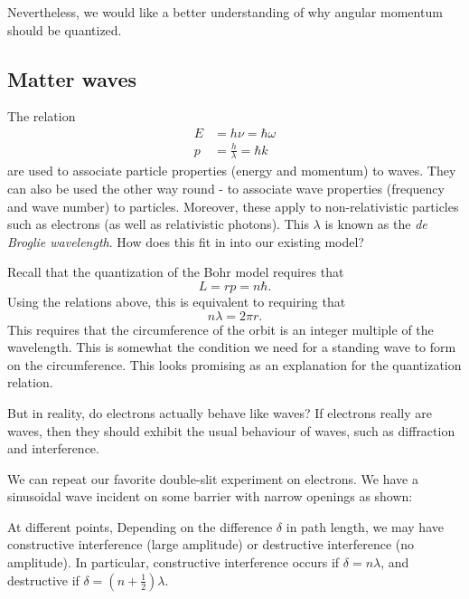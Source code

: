 \documentclass[a4paper]{article}
\begin{document}
Nevertheless, we would like a better understanding of why angular momentum should be quantized.

\subsection{Matter waves}
The relation
\begin{align*}
  E &= h\nu = \hbar \omega\\
  p &= \frac{h}{\lambda} = \hbar k
\end{align*}
are used to associate particle properties (energy and momentum) to waves. They can also be used the other way round - to associate wave properties (frequency and wave number) to particles. Moreover, these apply to non-relativistic particles such as electrons (as well as relativistic photons). This $\lambda$ is known as the \emph{de Broglie wavelength}. How does this fit in into our existing model?

Recall that the quantization of the Bohr model requires that
\[
  L = rp = n\hbar.
\]
Using the relations above, this is equivalent to requiring that
\[
  n\lambda = 2\pi r.
\]
This requires that the circumference of the orbit is an integer multiple of the wavelength. This is somewhat the condition we need for a standing wave to form on the circumference. This looks promising as an explanation for the quantization relation.

But in reality, do electrons actually behave like waves? If electrons really are waves, then they should exhibit the usual behaviour of waves, such as diffraction and interference.

We can repeat our favorite double-slit experiment on electrons. We have a sinusoidal wave incident on some barrier with narrow openings as shown:
\begin{center}
\end{center}
At different points, Depending on the difference $\delta$ in path length, we may have constructive interference (large amplitude) or destructive interference (no amplitude). In particular, constructive interference occurs if $\delta = n\lambda$, and destructive if $\delta = (n + \frac{1}{2})\lambda$.
\end{document}
